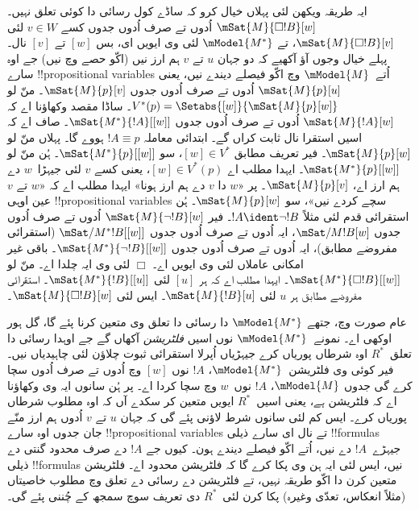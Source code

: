 \documentclass[../../../include/open-logic-section]{subfiles}
\begin{document}
ایہ طریقہ ویکھن لئی پہلاں خیال کرو کہ ساڈے کول رسائی دا کوئی تعلق نہیں۔ $\mSat{M}{\Box !B}[w]$ اُدوں تے صرف اُدوں جدوں کسے $v \in W$ لئی
$\mSat{M}{\Box !B}[v]$، تے $\mModel{M^*}$ لئی وی ایویں ای، بس
$[w]$ تے $[v]$ نال۔ پہلے خیال وجوں آؤ آکھیے کہ دو جہان $u$ تے
$v$ ہم ارز نیں (اکّو حصے وچ نیں) جے اوہ سارے !!{propositional variable}s اُتے~$\mModel{M}$ وچ اکّو فیصلے دیندے نیں، یعنی $\mSat{M}{p}[u]$
اُدوں تے صرف اُدوں جدوں $\mSat{M}{p}[v]$۔ منّ لو $V^*(p) = \Setabs{[w]}{\mSat{M}{p}[w]}$۔ ساڈا مقصد وکھاؤنا اے کہ $\mSat{M}{!A}[w]$ اُدوں تے صرف اُدوں جدوں
$\mSat{M^*}{!A}[{[w]}]$۔ صاف اے کہ اسیں استقرا نال ثابت کراں گے۔ ابتدائی معاملہ $!A \equiv p$ ہووے گا۔ پہلاں منّ لو $\mSat{M}{p}[w]$۔ فیر تعریف مطابق
$[w] \in V^*$، سو $\mSat{M^*}{p}[{[w]}]$۔ ہُن منّ لو
$\mSat{M^*}{p}[{[w]}]$۔ ایہدا مطلب اے $[w] \in V^*(p)$، یعنی کسے $v$ لئی جیہڑا~$w$ دے ہم ارز اے، $\mSat{M}{p}[v]$۔ پر «$w$ دا
$v$ دے ہم ارز ہونا» ایہدا مطلب اے کہ «$w$ تے $v$ عین اوہی !!{propositional variable}s سچے کردے نیں»، سو $\mSat{M}{p}[w]$۔ ہُن استقرائی قدم لئی مثلاً $!A
\ident \lnot !B$۔ فیر $\mSat{M}{\lnot !B}[w]$ اُدوں تے صرف اُدوں جدوں $\mSat/{M}{!B}[w]$، ایہ اُدوں تے صرف اُدوں جدوں $\mSat/{M^*}{!B}[{[w]}]$ (استقرائی مفروضے مطابق)، ایہ اُدوں تے صرف اُدوں جدوں
$\mSat{M^*}{\lnot !B}[{[w]}]$۔ باقی غیر امکانی عاملاں لئی وی ایویں اے۔ $\Box$ لئی وی ایہ چلدا اے۔ منّ لو $\mSat{M^*}{\Box
  !B}[{[w]}]$۔ ایہدا مطلب اے کہ ہر $[u]$ لئی
$\mSat{M^*}{!B}[{[u]}]$۔ استقرائی مفروضے مطابق ہر $u$ لئی
$\mSat{M}{!B}[u]$۔ ایس لئی $\mSat{M}{\Box !B}[w]$۔

عام صورت وچ، جتھے $\mModel{M^*}$ دا رسائی دا تعلق وی متعین کرنا پئے گا، گل ہور اوکھی اے۔ نمونے~$\mModel{M^*}$ نوں اسیں \emph{فلٹریشن} آکھاں گے جے اوہدا رسائی دا تعلق~$R^*$ اوہ شرطاں پوریاں کرے جیہڑیاں اُپرلا استقرائی ثبوت چلاؤن لئی چاہیدیاں نیں۔ فیر کوئی وی فلٹریشن~$\mModel{M^*}$، $!A$ نوں $[w]$ وچ اُدوں تے صرف اُدوں سچا کرے گی جدوں $\mModel{M}$، $!A$ نوں~$w$ وچ سچا کردا اے۔ پر ہُن سانوں ایہ وی وکھاؤنا اے کہ فلٹریشن \emph{ہے}، یعنی اسیں~$R^*$ ایویں متعین کر سکدے آں کہ اوہ مطلوب شرطاں پوریاں کرے۔ ایس کم لئی سانوں شرط لاؤنی پئے گی کہ جہان $u$ تے
$v$ اُدوں ہم ارز منّے جان جدوں اوہ سارے !!{propositional variable}s تے نال ای سارے ذیلی !!{formula}s جیہڑے~$!A$ دے نیں، اُتے اکّو فیصلے دیندے ہون۔ کیوں جے $!A$ دے صرف محدود گنتی دے ذیلی !!{formula}s نیں، ایس لئی ایہ ہن وی پکا کرے گا کہ فلٹریشن محدود اے۔ فلٹریشن متعین کرن دا اکّو طریقہ نہیں، تے فلٹریشن دے رسائی دے تعلق وچ مطلوب خاصیتاں (مثلاً انعکاس، تعدّی وغیرہ) پکا کرن لئی~$R^*$ دی تعریف سوچ سمجھ کے چُننی پئے گی۔
\end{document}
